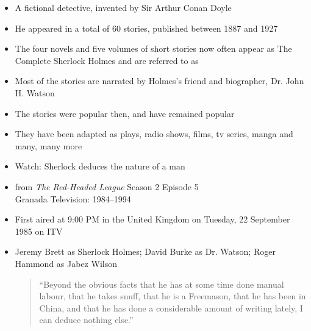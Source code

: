 \documentclass[a4paper,landscape,headrule,footrule,xetex,25pt]{foils}
\begin{document}

\begin{itemize}\addtolength{\itemsep}{-1ex}
\item A fictional detective, invented by Sir Arthur Conan Doyle
\item He appeared in a total of 60 stories,  published between 1887 and 1927
\item The four novels and five volumes of short stories now often
  appear as The Complete Sherlock Holmes and are referred to as 
\item Most of the stories are narrated by Holmes's friend and
  biographer, Dr. John H. Watson
\item The stories were popular then, and have remained popular
\item They have been adapted as plays, radio shows, films, tv series, manga and many, many more
\end{itemize}

\begin{itemize}
\item Watch: Sherlock deduces the nature of a man
\item from \textit{The Red-Headed League} Season 2 Episode 5
\\  Granada Television: 1984--1994
\item First aired at 9:00 PM in the United Kingdom on Tuesday, 22 September 1985 on ITV
\item Jeremy Brett as Sherlock Holmes; David Burke as Dr. Watson; Roger Hammond as Jabez Wilson
  \begin{quote}
     “Beyond the obvious facts that he has at some time done manual labour, that he takes snuff, that he is a Freemason, that he has been in China, and that he has done a considerable amount of writing lately, I can deduce nothing else.”
  \end{quote}
\end{itemize}



\end{document}
